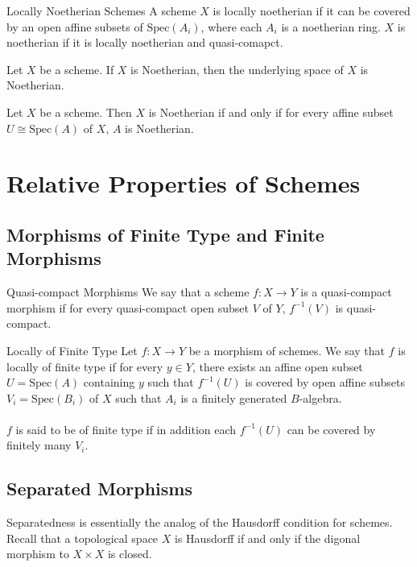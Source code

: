 \documentclass[a4paper]{article}
\begin{document}
\begin{defn}{Locally Noetherian Schemes}{} A scheme $X$ is locally noetherian if it can be covered by an open affine subsets of $\text{Spec}(A_i)$, where each $A_i$ is a noetherian ring. $X$ is noetherian if it is locally noetherian and quasi-comapct. 
\end{defn}

\begin{lmm}{}{} Let $X$ be a scheme. If $X$ is Noetherian, then the underlying space of $X$ is Noetherian. 
\end{lmm}

\begin{prp}{}{} Let $X$ be a scheme. Then $X$ is Noetherian if and only if for every affine subset $U\cong\text{Spec}(A)$ of $X$, $A$ is Noetherian. 
\end{prp}

\pagebreak
\section{Relative Properties of Schemes}
\subsection{Morphisms of Finite Type and Finite Morphisms}
\begin{defn}{Quasi-compact Morphisms}{} We say that a scheme $f:X\to Y$ is a quasi-compact morphism if for every quasi-compact open subset $V$ of $Y$, $f^{-1}(V)$ is quasi-compact. 
\end{defn}

\begin{defn}{Locally of Finite Type}{} Let $f:X\to Y$ be a morphism of schemes. We say that $f$ is locally of finite type if for every $y\in Y$, there exists an affine open subset $U=\text{Spec}(A)$ containing $y$ such that $f^{-1}(U)$ is covered by open affine subsets $V_i=\text{Spec}(B_i)$ of $X$ such that $A_i$ is a finitely generated $B$-algebra. \\~\\

$f$ is said to be of finite type if in addition each $f^{-1}(U)$ can be covered by finitely many $V_i$. 
\end{defn}

\subsection{Separated Morphisms}
Separatedness is essentially the analog of the Hausdorff condition for schemes. Recall that a topological space $X$ is Hausdorff if and only if the digonal morphism to $X\times X$ is closed. 
\end{document}
